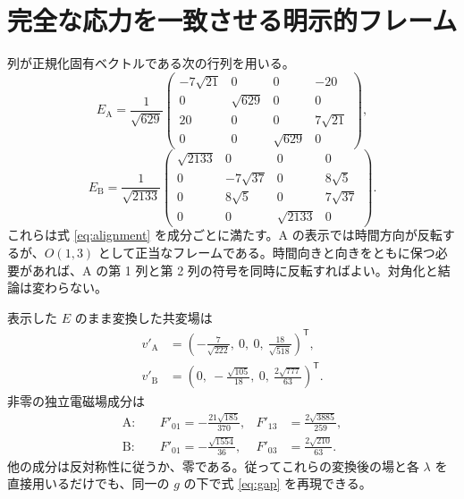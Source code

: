 \documentclass[11pt,a4paper]{article}
\begin{document}
\section{完全な応力を一致させる明示的フレーム}
列が正規化固有ベクトルである次の行列を用いる。
\begin{equation}\label{eq:EA}
E_{\mathrm A}=\frac1{\sqrt{629}}\begin{pmatrix}
-7\sqrt{21}&0&0&-20\\
0&\sqrt{629}&0&0\\
20&0&0&7\sqrt{21}\\
0&0&\sqrt{629}&0
\end{pmatrix},
\end{equation}
\begin{equation}\label{eq:EB}
E_{\mathrm B}=\frac1{\sqrt{2133}}\begin{pmatrix}
\sqrt{2133}&0&0&0\\
0&-7\sqrt{37}&0&8\sqrt5\\
0&8\sqrt5&0&7\sqrt{37}\\
0&0&\sqrt{2133}&0
\end{pmatrix}.
\end{equation}
これらは式 \eqref{eq:alignment} を成分ごとに満たす。A の表示では時間方向が反転するが、$O(1,3)$ として正当なフレームである。時間向きと向きをともに保つ必要があれば、A の第 1 列と第 2 列の符号を同時に反転すればよい。対角化と結論は変わらない。

表示した $E$ のまま変換した共変場は
\begin{equation}\label{eq:vprime}
\begin{aligned}
v'_{\mathrm A}&=\left(-\frac7{\sqrt{222}},\ 0,\ 0,\ \frac{18}{\sqrt{518}}\right)^{\!\mathsf T},\\
v'_{\mathrm B}&=\left(0,\ -\frac{\sqrt{105}}{18},\ 0,\ \frac{2\sqrt{777}}{63}\right)^{\!\mathsf T} .
\end{aligned}
\end{equation}
非零の独立電磁場成分は
\begin{equation}\label{eq:Fprime}
\begin{aligned}
\mathrm A:\quad&F'_{01}=-\frac{21\sqrt{185}}{370},&F'_{13}&=\frac{2\sqrt{3885}}{259},\\
\mathrm B:\quad&F'_{01}=-\frac{\sqrt{1554}}{36},&F'_{03}&=\frac{2\sqrt{210}}{63} .
\end{aligned}
\end{equation}
他の成分は反対称性に従うか、零である。従ってこれらの変換後の場と各 $\lambda$ を直接用いるだけでも、同一の $g$ の下で式 \eqref{eq:gap} を再現できる。
\end{document}
